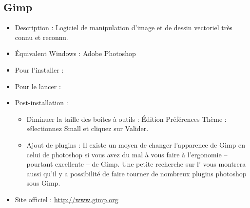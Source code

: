 \subsection{Gimp}
\label{RefInstallGimp}
\begin{itemize}
\begingroup
{}
\item Description : Logiciel de manipulation d'image et de dessin vectoriel très connu et reconnu.{\par}
\item Équivalent Windows : Adobe Photoshop{\par}
\item Pour l'installer : 
\item Pour le lancer : 
\item Post-installation :{\par}
\begin{itemize}
\item Diminuer la taille des boîtes à outils : Édition \FlecheDroite Préférences \FlecheDroite Thème : sélectionnez Small et cliquez sur Valider.{\par}
\item Ajout de plugins : Il existe un moyen de changer l'apparence de Gimp en celui de photoshop si vous avez du mal à vous faire à l'ergonomie -- pourtant excellente -- de Gimp. Une petite recherche sur l' vous montrera aussi qu'il y a possibilité de faire tourner de nombreux plugins photoshop sous Gimp.{\par}
\endgroup
\end{itemize}
\item Site officiel : \url{http://www.gimp.org}{\par}
\end{itemize}
